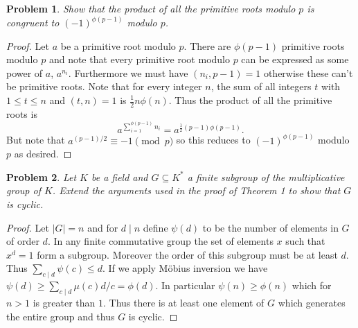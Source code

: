 \documentclass{article}
\newtheorem{problem}{Problem}
\begin{document}
\begin{problem}
Show that the product of all the primitive roots modulo $p$ is congruent to $(-1)^{\phi(p-1)}$ modulo $p$.
\end{problem}
\begin{proof}
Let $a$ be a primitive root modulo $p$. There are $\phi(p-1)$ primitive roots modulo $p$ and note that every primitive root modulo $p$ can be expressed as some power of $a$, $a^{n_i}$. Furthermore we must have $(n_i, p-1) = 1$ otherwise these can't be primitive roots. Note that for every integer $n$, the sum of all integers $t$ with $1 \leq t \leq n$ and $(t,n) = 1$ is $\frac{1}{2} n \phi(n)$. Thus the product of all the primitive roots is
\[
a^{\sum_{i=1}^{\phi(p-1)} n_i} = a^{\frac{1}{2}(p-1)\phi(p-1)}.
\]
But note that $a^{(p-1)/2} \equiv -1 \pmod{p}$ so this reduces to $(-1)^{\phi(p-1)}$ modulo $p$ as desired.
\end{proof}

\begin{problem}
Let $K$ be a field and $G \subseteq K^*$ a finite subgroup of the multiplicative group of $K$. Extend the arguments used in the proof of Theorem 1 to show that $G$ is cyclic.
\end{problem}
\begin{proof}
Let $|G| = n$ and for $d \mid n$ define $\psi(d)$ to be the number of elements in $G$ of order $d$. In any finite commutative group the set of elements $x$ such that $x^d = 1$ form a subgroup. Moreover the order of this subgroup must be at least $d$. Thus $\sum_{c \mid d} \psi(c) \leq d$. If we apply M\"{o}bius inversion we have $\psi(d) \geq \sum_{c \mid d} \mu(c) d/c = \phi(d)$. In particular $\psi(n) \geq \phi(n)$ which for $n > 1$ is greater than $1$. Thus there is at least one element of $G$ which generates the entire group and thus $G$ is cyclic.
\end{proof}
\end{document}
